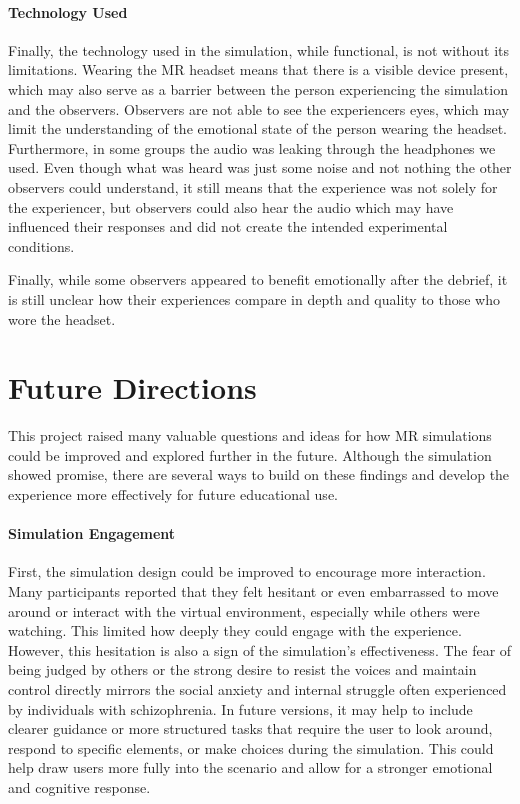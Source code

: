 \paragraph{Technology Used} Finally, the technology used in the simulation, while functional, is not without its limitations. Wearing the MR headset means that there is a visible device present, which may also serve as a barrier between the person experiencing the simulation and the observers. Observers are not able to see the experiencers eyes, which may limit the understanding of the emotional state of the person wearing the headset. Furthermore, in some groups the audio was leaking through the headphones we used. Even though what was heard was just some noise and not nothing the other observers could understand, it still means that the experience was not solely for the experiencer, but observers could also hear the audio which may have influenced their responses and did not create the intended experimental conditions.

\vspace{1em}

Finally, while some observers appeared to benefit emotionally after the debrief, it is still unclear how their experiences compare in depth and quality to those who wore the headset. 

\section{Future Directions}

This project raised many valuable questions and ideas for how MR simulations could be improved and explored further in the future. Although the simulation showed promise, there are several ways to build on these findings and develop the experience more effectively for future educational use.

\paragraph{Simulation Engagement} First, the simulation design could be improved to encourage more interaction. Many participants reported that they felt hesitant or even embarrassed to move around or interact with the virtual environment, especially while others were watching. This limited how deeply they could engage with the experience. However, this hesitation is also a sign of the simulation's effectiveness. The fear of being judged by others or the strong desire to resist the voices and maintain control directly mirrors the social anxiety and internal struggle often experienced by individuals with schizophrenia.
In future versions, it may help to include clearer guidance or more structured tasks that require the user to look around, respond to specific elements, or make choices during the simulation. This could help draw users more fully into the scenario and allow for a stronger emotional and cognitive response.

